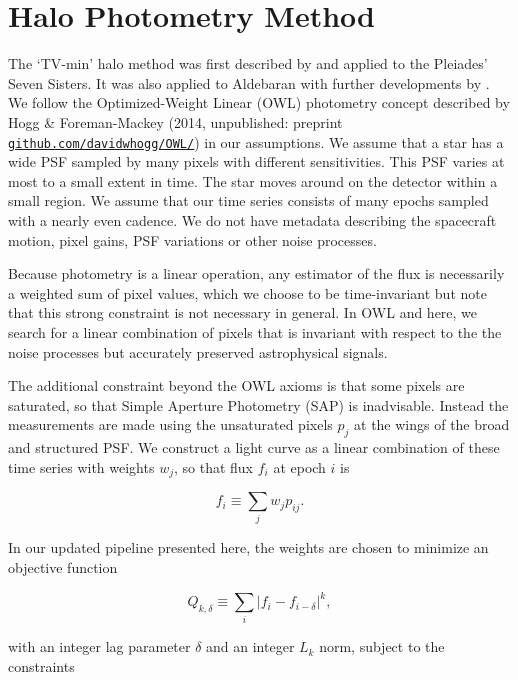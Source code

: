 \documentclass[modern]{aastex62}
\begin{document}
\section{Halo Photometry Method}
\label{method}


The `TV-min' halo method was first described by \citet{White2017} and applied to the Pleiades' Seven Sisters. It was also applied to Aldebaran with further developments by \citet{Farr2018}. We follow the Optimized-Weight Linear (OWL) photometry concept described by Hogg \&  Foreman-Mackey (2014, unpublished: preprint  \href{https://github.com/davidwhogg/OWL/}{\nolinkurl{github.com/davidwhogg/OWL/}}) in our assumptions. We assume that a star has a wide PSF sampled by many pixels with different sensitivities. This PSF varies at most to a small extent in time. The star moves around on the detector within a small region. We assume that our time series consists of many epochs sampled with a nearly even cadence. We do not have metadata describing the spacecraft motion, pixel gains, PSF variations or other noise processes. 

Because photometry is a linear operation, any estimator of the flux is necessarily a weighted sum of pixel values, which we choose to be time-invariant but note that this strong constraint is not necessary in general. In OWL and here, we search for a linear combination of pixels that is invariant with respect to the the noise processes but accurately preserved astrophysical signals.

The additional constraint beyond the OWL axioms is that some pixels are saturated, so that Simple Aperture Photometry (SAP) is inadvisable. Instead the measurements are made using the unsaturated pixels $p_j$ at the wings of the broad and structured PSF. We construct a light curve as a linear combination of these time series with weights $w_j$, so that flux $f_i$ at epoch $i$ is 

\begin{equation}
    f_i \equiv \sum_j {w_j p_{ij}}.
\end{equation}

\noindent In our updated pipeline presented here, the weights are chosen to minimize an objective function

\begin{equation}
    Q_{k,\delta} \equiv {\sum_i{|f_i - f_{i-\delta}|^k}},
\end{equation}

\noindent with an integer lag parameter $\delta$ and an integer $L_k$ norm, subject to the constraints 
\end{document}
